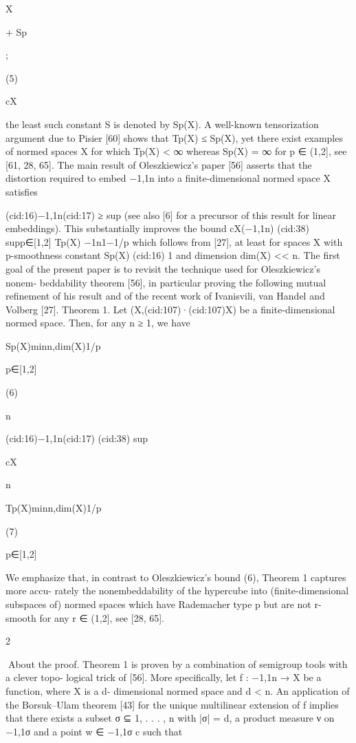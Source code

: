 X

+ Sp

;

(5)

cX

the least such constant S is denoted by Sp(X). A well-known tensorization argument due to
Pisier [60] shows that Tp(X) ≤ Sp(X), yet there exist examples of normed spaces X for which
Tp(X) < ∞ whereas Sp(X) = ∞ for p ∈ (1,2], see [61, 28, 65]. The main result of Oleszkiewicz’s
paper [56] asserts that the distortion required to embed {−1,1}n into a ﬁnite-dimensional
normed space X satisﬁes

(cid:16){−1,1}n(cid:17) ≥ sup
(see also [6] for a precursor of this result for linear embeddings). This substantially improves
the bound cX({−1,1}n) (cid:38) supp∈[1,2] Tp(X)
−1n1−1/p which follows from [27], at least for spaces X
with p-smoothness constant Sp(X) (cid:16) 1 and dimension dim(X) << n.
The ﬁrst goal of the present paper is to revisit the technique used for Oleszkiewicz’s nonem-
beddability theorem [56], in particular proving the following mutual reﬁnement of his result
and of the recent work of Ivanisvili, van Handel and Volberg [27].
Theorem 1. Let (X,(cid:107)·(cid:107)X) be a ﬁnite-dimensional normed space. Then, for any n ≥ 1, we have

Sp(X)min{n,dim(X)}1/p

p∈[1,2]

(6)

n

(cid:16){−1,1}n(cid:17) (cid:38) sup

cX

n

Tp(X)min{n,dim(X)}1/p

(7)

p∈[1,2]

We emphasize that, in contrast to Oleszkiewicz’s bound (6), Theorem 1 captures more accu-
rately the nonembeddability of the hypercube into (ﬁnite-dimensional subspaces of) normed
spaces which have Rademacher type p but are not r-smooth for any r ∈ (1,2], see [28, 65].

2

About the proof. Theorem 1 is proven by a combination of semigroup tools with a clever topo-
logical trick of [56]. More speciﬁcally, let f : {−1,1}n → X be a function, where X is a d-
dimensional normed space and d < n. An application of the Borsuk–Ulam theorem [43] for the
unique multilinear extension of f implies that there exists a subset σ ⊆ {1, . . . , n} with |σ| = d, a
product measure ν on {−1,1}σ and a point w ∈ {−1,1}σ c such that

